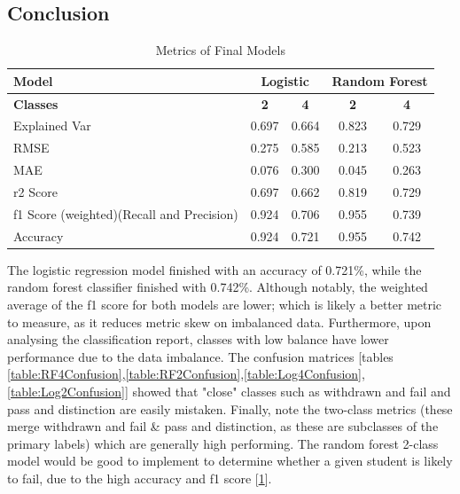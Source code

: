 \documentclass[11pt, a4paper]{article}
\begin{document}
\begin{multicols}{2}
\section{Conclusion}

\begin{table}[H]
	\centering
	\begin{tabular}{|p{3.4cm}|c|c|c|c|}
	  \hline
	  \textbf{Model} & \multicolumn{2}{c|}{\textbf{Logistic}} & \multicolumn{2}{c|}{\textbf{Random Forest}}\\
	  \cline{2-5}\hline
	  \textbf{Classes}& \textbf{2} & \textbf{4} & \textbf{2} & \textbf{4}\\
	  \hline
	  Explained Var 									& 0.697 & 0.664 & 0.823 & 0.729  \\ \hline
	  RMSE 												& 0.275 & 0.585 & 0.213 & 0.523  \\ \hline
	  MAE 												& 0.076 & 0.300 & 0.045 & 0.263  \\ \hline
	  r2 Score 											& 0.697 & 0.662 & 0.819 & 0.729  \\ \hline
	  f1 Score (weighted)\newline (Recall and Precision) & 0.924 & 0.706 & 0.955 & 0.739  \\ \hline
	  Accuracy 											& 0.924 & 0.721 & 0.955 & 0.742  \\ \hline
	\end{tabular}
	\caption{Metrics of Final Models}
	\label{table:metrics}
  \end{table}

  The logistic regression model finished with an accuracy of 0.721\%, while the random forest classifier finished with 0.742\%.
  Although notably, the weighted average of the f1 score for both models are lower; which is likely a better metric to measure, as it reduces metric skew on imbalanced data. Furthermore, upon analysing the classification report, classes with low balance have lower performance due to the data imbalance.
  The confusion matrices [tables \ref{table:RF4Confusion},\ref{table:RF2Confusion},\ref{table:Log4Confusion},\ref{table:Log2Confusion}] showed that "close" classes such as withdrawn and fail and pass and distinction are easily mistaken.
  Finally, note the two-class metrics (these merge withdrawn and fail \& pass and distinction, as these are subclasses of the primary labels) which are generally high performing. The random forest 2-class model would be good to implement to determine whether a given student is likely to fail, due to the high accuracy and f1 score [\ref{table:metrics}].


\end{multicols}
\end{document}
